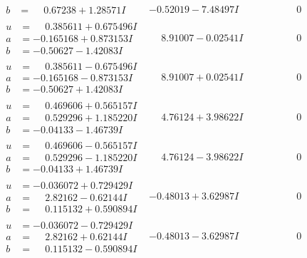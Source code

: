 \documentclass[1p]{elsarticle_modified}
\theoremstyle{definition}
\begin{document}
$$\begin{array}{c|c|c}
\begin{aligned}
b &= \phantom{-}0.67238 + 1.28571 I\end{aligned}
 & -0.52019 - 7.48497 I & \phantom{-0.000000 } 0 \\ \hline\begin{aligned}
u &= \phantom{-}0.385611 + 0.675496 I \\
a &= -0.165168 + 0.873153 I \\
b &= -0.50627 - 1.42083 I\end{aligned}
 & \phantom{-}8.91007 - 0.02541 I & \phantom{-0.000000 } 0 \\ \hline\begin{aligned}
u &= \phantom{-}0.385611 - 0.675496 I \\
a &= -0.165168 - 0.873153 I \\
b &= -0.50627 + 1.42083 I\end{aligned}
 & \phantom{-}8.91007 + 0.02541 I & \phantom{-0.000000 } 0 \\ \hline\begin{aligned}
u &= \phantom{-}0.469606 + 0.565157 I \\
a &= \phantom{-}0.529296 + 1.185220 I \\
b &= -0.04133 - 1.46739 I\end{aligned}
 & \phantom{-}4.76124 + 3.98622 I & \phantom{-0.000000 } 0 \\ \hline\begin{aligned}
u &= \phantom{-}0.469606 - 0.565157 I \\
a &= \phantom{-}0.529296 - 1.185220 I \\
b &= -0.04133 + 1.46739 I\end{aligned}
 & \phantom{-}4.76124 - 3.98622 I & \phantom{-0.000000 } 0 \\ \hline\begin{aligned}
u &= -0.036072 + 0.729429 I \\
a &= \phantom{-}2.82162 - 0.62144 I \\
b &= \phantom{-}0.115132 + 0.590894 I\end{aligned}
 & -0.48013 + 3.62987 I & \phantom{-0.000000 } 0 \\ \hline\begin{aligned}
u &= -0.036072 - 0.729429 I \\
a &= \phantom{-}2.82162 + 0.62144 I \\
b &= \phantom{-}0.115132 - 0.590894 I\end{aligned}
 & -0.48013 - 3.62987 I & \phantom{-0.000000 } 0 \\ \hline\begin{aligned}

\end{aligned}
\end{array}$$
\end{document}
